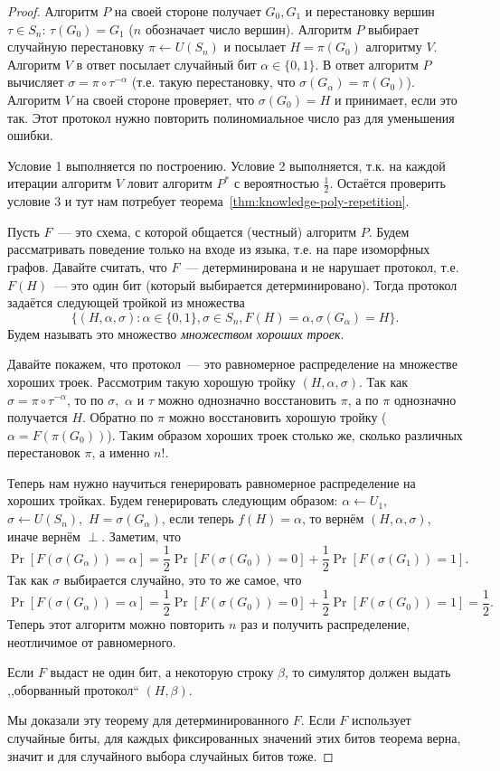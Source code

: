 \documentclass[12pt,a4paper]{article}
\newcommand{\bits}{\{0,1\}}
\theoremstyle{definition}
\theoremstyle{plain}
\theoremstyle{remark}
\begin{document}
\begin{proof}
Алгоритм $P$ на своей стороне получает $G_0, G_1$ и перестановку вершин $\tau\in S_n$: $\tau(G_0) = G_1$
($n$ обозначает число вершин). Алгоритм $P$ выбирает случайную перестановку $\pi\gets U(S_n)$ и посылает
$H = \pi(G_0)$ алгоритму $V$. Алгоритм $V$ в ответ посылает случайный бит $\alpha\in\{0,1\}$.
В ответ алгоритм $P$ вычисляет $\sigma = \pi\circ\tau^{-\alpha}$ (т.е. такую перестановку, что $\sigma(G_\alpha) = \pi(G_0)$). Алгоритм $V$ на своей стороне проверяет, что $\sigma(G_0) = H$ и принимает, если это так. Этот протокол нужно повторить полиномиальное число раз для уменьшения ошибки.

Условие 1 выполняется по построению. Условие 2 выполняется, т.к. на каждой итерации алгоритм $V$
ловит алгоритм $P^*$ с вероятностью $\frac{1}{2}$. Остаётся проверить условие 3 и тут нам потребует теорема~\ref{thm:knowledge-poly-repetition}.

Пусть $F$~--- это схема, с которой общается (честный) алгоритм $P$.
Будем рассматривать поведение только на входе из языка, т.е. на
паре изоморфных графов.
Давайте считать, что $F$~--- детерминирована и не нарушает протокол,
т.е. $F(H)$~--- это один бит (который выбирается детерминировано).
Тогда протокол задаётся следующей тройкой из множества  
$$\{(H,\alpha,\sigma): \alpha\in\bits, \sigma\in S_n, F(H)=\alpha, \sigma(G_\alpha)= H\}.$$ Будем называть это множество \emph{множеством хороших троек}.

Давайте покажем, что протокол~--- это равномерное распределение на множестве хороших троек. Рассмотрим такую хорошую тройку $(H,\alpha,\sigma)$. Так как $\sigma = \pi\circ\tau^{-\alpha}$,
то по $\sigma,$ $\alpha$ и $\tau$ можно однозначно 
восстановить $\pi$, а по $\pi$ однозначно получается $H$. Обратно по $\pi$ можно восстановить хорошую тройку ($\alpha= F(\pi(G_0))$). Таким образом хороших троек столько же, сколько различных перестановок $\pi$, а именно $n!$. 

Теперь нам нужно научиться генерировать
равномерное распределение на хороших тройках. Будем генерировать
следующим образом: $\alpha\gets U_1,$ $\sigma\gets U(S_n),$ $H=\sigma(G_\alpha)$, если теперь $f(H)=\alpha$, то вернём $(H,\alpha,\sigma)$, иначе вернём $\perp$. Заметим, что
$$\Pr[F(\sigma(G_\alpha)) = \alpha] = 
\frac12\Pr[F(\sigma(G_0)) = 0] +
\frac12\Pr[F(\sigma(G_1)) = 1].
$$
Так как $\sigma$ выбирается случайно, это то же самое, что 
$$\Pr[F(\sigma(G_\alpha)) = \alpha] = 
\frac12\Pr[F(\sigma(G_0)) = 0] +
\frac12\Pr[F(\sigma(G_0)) = 1] = \frac12.
$$
Теперь этот алгоритм можно повторить $n$ раз и получить распределение, неотличимое от равномерного.

Если $F$ выдаст не один бит, а некоторую строку $\beta$, то симулятор должен выдать ,,оборванный протокол`` $(H,\beta)$.

Мы доказали эту теорему для детерминированного $F$. 
Если $F$ использует случайные биты, для каждых фиксированных
значений этих битов теорема верна, значит и для случайного выбора
случайных битов тоже.
\end{proof}
\end{document}
